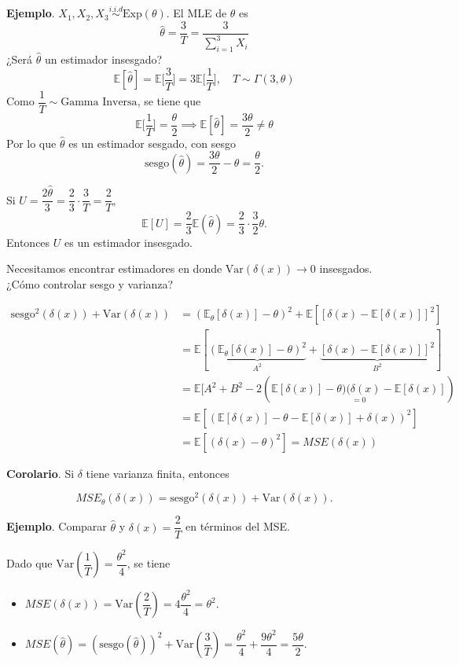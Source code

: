 \documentclass[
  12pt,
]{book}
\begin{document}
\textbf{Ejemplo}. \(X_1,X_2,X_3 \overset{i.i.d}{\sim} \text{Exp}(\theta)\). El MLE de \(\theta\) es
\[\hat\theta = \dfrac 3T = \dfrac 3{\sum_{i=1}^{3}X_i}\]
¿Será \(\hat\theta\) un estimador insesgado?
\[\mathbb E[\hat\theta] = \mathbb E\bigg[\dfrac 3T\bigg]= 3\mathbb E\bigg[\dfrac 1T\bigg], \quad T\sim \Gamma(3,\theta)\]
Como
\(\dfrac 1T \sim \text{Gamma Inversa}\), se tiene que
\[\mathbb E\bigg[\dfrac 1T\bigg] = \dfrac{\theta}2 \implies \mathbb E[\hat \theta] =\dfrac{3\theta}2 \neq \theta\]
Por lo que \(\hat \theta\) es un estimador sesgado, con sesgo
\[\text{sesgo}(\hat\theta) = \dfrac{3\theta}{2} -\theta = \dfrac \theta 2.\]

Si \(U = \dfrac {2\hat\theta}{3} = \dfrac 23 \cdot \dfrac{3}{T} = \dfrac 2T\),
\[\mathbb E[U] = \dfrac 23 \mathbb E(\hat\theta) =\dfrac 23 \cdot \dfrac 32 \theta.\]
Entonces \(U\) es un estimador insesgado.

Necesitamos encontrar estimadores en donde \(\text{Var}(\delta(x))\to 0\) insesgados. ¿Cómo controlar sesgo y varianza?

\begin{align*}
\text{sesgo}^2(\delta(x))+\text{Var}(\delta(x)) & = (\mathbb E_\theta[\delta(x)]-\theta)^2 + \mathbb E[[\delta(x)-\mathbb E[\delta(x)]]^2]\\
	& =\mathbb E[ \underbrace{(\mathbb E_\theta[\delta(x)]-\theta)^2}_{A^2} + \underbrace{[\delta(x)-\mathbb E[\delta(x)]]^2}_{B^2}]\\
	& = \mathbb E[A^2+B^2 - 2(\underset{=0}{\mathbb E[\delta(x)]-\theta)(\delta(x)-\mathbb E[\delta(x)]})\\
	& =  \mathbb E[(\mathbb E[\delta(x)]-\theta - \mathbb E[\delta(x)] + \delta(x))^2]\\
	& = \mathbb E[(\delta(x)-\theta)^2] = MSE(\delta(x))
\end{align*}

\textbf{Corolario}. Si \(\delta\) tiene varianza finita, entonces

\[MSE_{\theta}(\delta(x)) =\text{sesgo}^2(\delta(x)) + \text{Var}(\delta(x)).\]

\textbf{Ejemplo}. Comparar \(\hat\theta\) y \(\delta(x) =\dfrac 2T\) en términos del MSE.

Dado que \(\text{Var}\left(\dfrac 1T\right) = \dfrac{\theta^2}4\), se tiene

\begin{itemize}
\item
  \(MSE(\delta(x)) = \text{Var}\left(\dfrac 2T\right) = 4\dfrac{\theta^2}4 = \theta^2\).
\item
  \(MSE(\hat\theta) = (\text{sesgo}(\hat\theta))^2+\text{Var}\left(\dfrac 3T\right) = \dfrac{\theta^2}{4}+\dfrac{9\theta^2}{4} = \dfrac{5\theta}{2}\).
\end{itemize}
\end{document}
